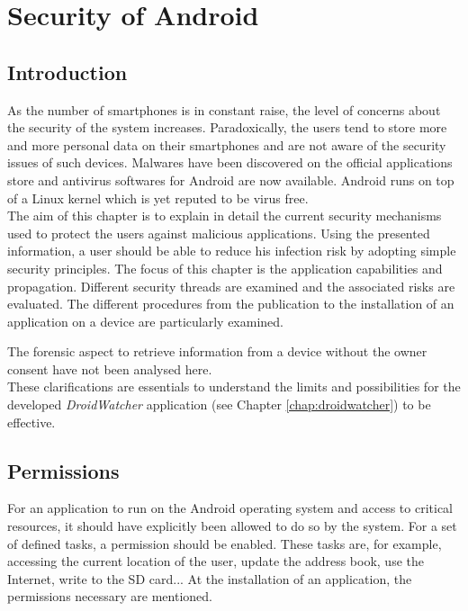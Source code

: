 \chapter{Security of Android}
\label{chap:and-secu}

\section*{Introduction}
As the number of smartphones is in constant raise, the level of concerns about the security of the system increases.
Paradoxically, the users tend to store more and more personal data on their smartphones and are not aware of the security issues of such devices.
Malwares have been discovered on the official applications store and antivirus softwares for Android are now available.
Android runs on top of a Linux kernel which is yet reputed to be virus free.\\

The aim of this chapter is to explain in detail the current security mechanisms used to protect the users against malicious applications.
Using the presented information, a user should be able to reduce his infection risk by adopting simple security principles.
The focus of this chapter is the application capabilities and propagation.
Different security threads are examined and the associated risks are evaluated.
The different procedures from the publication to the installation of an application on a device are particularly examined.

The forensic aspect to retrieve information from a device without the owner consent have not been analysed here.\\

These clarifications are essentials to understand the limits and possibilities for the developed \emph{DroidWatcher} application (see Chapter \ref{chap:droidwatcher}) to be effective.

\section{Permissions}
\label{sec:permissions}

For an application to run on the Android operating system and access to critical resources, it should have explicitly been allowed to do so by the system. %
For a set of defined tasks, a permission should be enabled.
These tasks are, for example, accessing the current location of the user, update the address book, use the Internet, write to the SD card...
At the installation of an application, the permissions necessary are mentioned.\\

